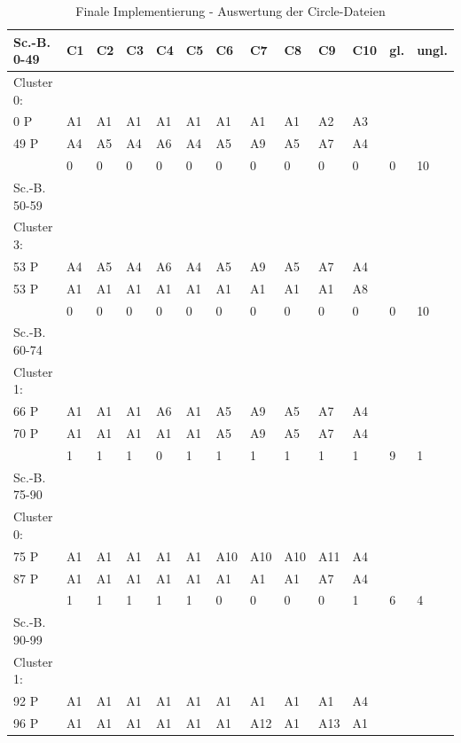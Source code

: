 \begin{table}[h]
    \centering
    \begin{tabular}{|l|l|l|l|l|l|l|l|l|l|l|l|l|}
    \hline
        Sc.-B. 0-49 & C1 & C2 & C3 & C4 & C5 & C6 & C7 & C8 & C9 & C10 & gl. & ungl. \\ \hline
        Cluster 0: & ~ & ~ & ~ & ~ & ~ & ~ & ~ & ~ & ~ & ~ & ~ & ~ \\ \hline
             0 P & A1 & A1 & A1 & A1 & A1 & A1 & A1 & A1 & A2 & A3 & ~ & ~ \\ \hline
             49 P & A4 & A5 & A4 & A6 & A4 & A5 & A9 & A5 & A7 & A4 & ~ & ~ \\ \hline
        ~ & 0 & 0 & 0 & 0 & 0 & 0 & 0 & 0 & 0 & 0 & 0 & 10 \\ \hline
        Sc.-B. 50-59 & ~ & ~ & ~ & ~ & ~ & ~ & ~ & ~ & ~ & ~ & ~ & ~ \\ \hline
        Cluster 3: & ~ & ~ & ~ & ~ & ~ & ~ & ~ & ~ & ~ & ~ & ~ & ~ \\ \hline
          53 P & A4 & A5 & A4 & A6 & A4 & A5 & A9 & A5 & A7 & A4 & ~ & ~ \\ \hline
          53 P & A1 & A1 & A1 & A1 & A1 & A1 & A1 & A1 & A1 & A8 & ~ & ~ \\ \hline
        ~ & 0 & 0 & 0 & 0 & 0 & 0 & 0 & 0 & 0 & 0 & 0 & 10 \\ \hline
        Sc.-B.  60-74 & ~ & ~ & ~ & ~ & ~ & ~ & ~ & ~ & ~ & ~ & ~ & ~ \\ \hline
        Cluster 1: & ~ & ~ & ~ & ~ & ~ & ~ & ~ & ~ & ~ & ~ & ~ & ~ \\ \hline
          66 P & A1 & A1 & A1 & A6 & A1 & A5 & A9 & A5 & A7 & A4 & ~ & ~ \\ \hline
          70 P & A1 & A1 & A1 & A1 & A1 & A5 & A9 & A5 & A7 & A4 & ~ & ~ \\ \hline
        ~ & 1 & 1 & 1 & 0 & 1 & 1 & 1 & 1 & 1 & 1 & 9 & 1 \\ \hline
        Sc.-B. 75-90 & ~ & ~ & ~ & ~ & ~ & ~ & ~ & ~ & ~ & ~ & ~ & ~ \\ \hline
        Cluster 0: & ~ & ~ & ~ & ~ & ~ & ~ & ~ & ~ & ~ & ~ & ~ & ~ \\ \hline
          75 P & A1 & A1 & A1 & A1 & A1 & A10 & A10 & A10 & A11 & A4 & ~ & ~ \\ \hline
          87 P & A1 & A1 & A1 & A1 & A1 & A1 & A1 & A1 & A7 & A4 & ~ & ~ \\ \hline
        ~ & 1 & 1 & 1 & 1 & 1 & 0 & 0 & 0 & 0 & 1 & 6 & 4 \\ \hline
        Sc.-B. 90-99 & ~ & ~ & ~ & ~ & ~ & ~ & ~ & ~ & ~ & ~ & ~ & ~ \\ \hline
        Cluster 1: & ~ & ~ & ~ & ~ & ~ & ~ & ~ & ~ & ~ & ~ & ~ & ~ \\ \hline
          92 P & A1 & A1 & A1 & A1 & A1 & A1 & A1 & A1 & A1 & A4 & ~ & ~ \\ \hline
          96 P & A1 & A1 & A1 & A1 & A1 & A1 & A12 & A1 & A13 & A1 & ~ & ~ \\ \hline
    \end{tabular}
	\caption{Finale Implementierung - Auswertung der Circle-Dateien}
\label{tab:A-d-CD}
\end{table}

